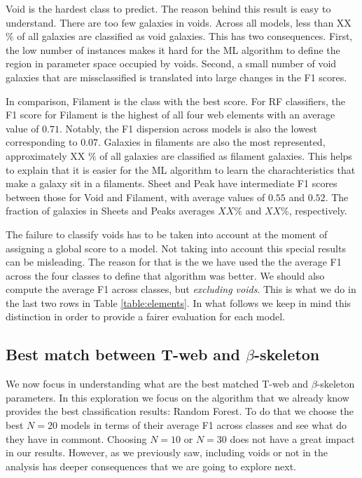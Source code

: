 \documentclass[usenatbib]{mnras}
\begin{document}
Void is the hardest class to predict. 
The reason behind this result is easy to understand. 
There are too few galaxies in voids. 
Across all models, less than XX $\%$ of all galaxies
are classified as void galaxies. 
This has two consequences.
First, the low number of instances makes it hard for the ML algorithm to
define the region in parameter space occupied by voids.
Second, a small number of void galaxies that are missclassified is
translated into large changes in the F1 scores.

In comparison, Filament is the class with the best score.
For RF classifiers, the F1 score for Filament is the highest of all four
web elements with an average value of  $0.71$.
Notably, the F1 dispersion across models is also the lowest
corresponding to $0.07$.
Galaxies in filaments are also the most represented,
approximately XX $\%$ of all galaxies are classified as filament
galaxies.
This helps to explain that it is easier for the ML algorithm to learn
the charachteristics that make a galaxy sit in a filaments.
Sheet and Peak have intermediate F1 scores between
those for Void and Filament, with average values of $0.55$ and $0.52$.
The fraction of galaxies in Sheets and Peaks averages $XX\%$ and $XX\%$,
respectively. 

The failure to classify voids has to be taken into account at the
moment of assigning a global score to a model.
Not taking into account this special results can be misleading.
The reason for that is the we have used the the average F1 across the
four classes to define that algorithm was better. 
We should also compute the average F1 across classes, but
\emph{excluding voids}.
This is what we do in the last two rows in Table \ref{table:elements}.
In what follows we keep in mind this distinction in order to provide a
fairer evaluation for each model.




\subsection{Best match between T-web and $\beta$-skeleton}

We now focus in understanding what are the best matched T-web and
$\beta$-skeleton parameters.
In this exploration we focus on the algorithm that we already know
provides the best classification results: Random Forest. 
To do that we choose the best $N=20$ models in terms of their average F1 across
classes and see what do they have in commont.
Choosing $N=10$ or $N=30$ does not have a great impact in our
results. 
However, as we previously saw, including voids or not in the analysis
has deeper consequences that we are going to explore next.
\end{document}
